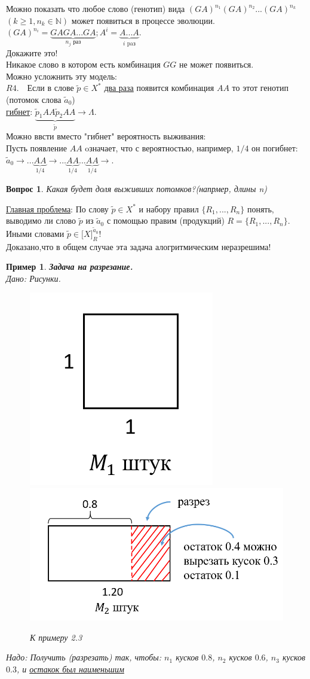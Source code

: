 \documentclass{article}
\newtheorem{example}{Пример}
\newtheorem{question}{Вопрос}
\numberwithin{example}{section}
\numberwithin{question}{section}
\numberwithin{Remark}{section}
\numberwithin{theorem}{section}
\numberwithin{definition}{section}
\numberwithin{proposition}{section}
\begin{document}
Можно показать что любое слово (генотип) вида $(GA)^{n_1}(GA)^{n_2}...(GA)^{n_k}$\\
$(k\geq 1,n_k\in\mathbb{N})$ может появиться в процессе эволюции.\\
$(GA)^{n_i}=\underbrace{GAGA...GA}_{n_j \text{ раз}};A^i=\underbrace{A...A}_{i \text{ paз}}$.\\
Докажите это!\\
Никакое слово в котором есть комбинация $GG$ не может появиться.\\
Можно усложнить эту модель:\\
$R4.\quad$Если в слове $\widetilde{p}\in X^*$ \underline{два раза} появится комбинация $AA$ то этот генотип (потомок слова $\widetilde{a}_0$)\\
\underline{гибнет}: $\underbrace{\widetilde{p}_1 AA\widetilde{p}_2 AA}_{\widetilde{p}}\to\Lambda$.\\
Можно ввсти вместо "гибнет"  вероятность выживания:\\
Пусть появление $AA$ oзначает, что с вероятностью, например, $1/4$ он погибнет: $\widetilde{a}_0\to ... \underbrace{AA}_{1/4}\to ... \underbrace{AA}_{1/4}...\underbrace{AA}_{1/4}\to$.
\begin{question}
	Какая будет доля выживших потомков?(напрмер, длины n)
\end{question} 
\underline{Главная проблема}: По слову $\widetilde{p}\in X^*$ и набору правил $\{R_1,...,R_n\}$ понять, выводимо ли слово $\widetilde{p}$ из $\widetilde{a}_0$ с помощью правим (продукций) $R=\{R_1,...,R_n\}$. Иными словами $\widetilde{p}\in \big[X\big]^{\widetilde{a}_0}_R$!\\
Доказано,что в общем случае эта задача алогритмическим неразрешима!
\begin{example}\textbf{Задача на разрезание.}\\
Дано: Рисунки.\\
\begin{figure}[!htp]
	\centering
	\includegraphics[width=0.2\linewidth]{2-1}
	\label{fig:2-1}
	\includegraphics[width=0.5\linewidth]{2-2}
	\label{fig:2-2}
	\caption{К примеру 2.3}
\end{figure}
Надо: Получить (разрезать) так, чтобы: $n_1$ кусков $0.8$, $n_2$ кусков $0.6$, $n_3$ кусков $0.3$, и \underline{остакок был наименьшим}
\end{example}
\end{document}

